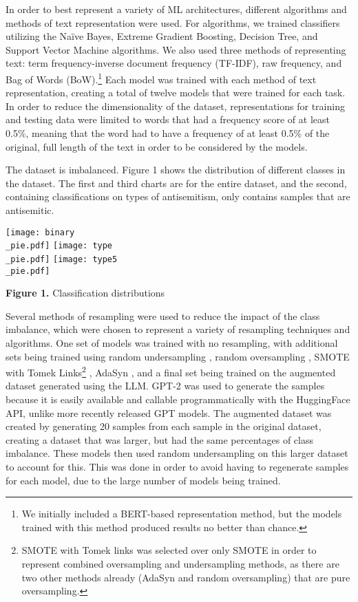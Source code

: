 \documentclass[runningheads]{llncs}
\newenvironment{nscenter}
 {\parskip=0pt\par\nopagebreak\centering}
 {\par\noindent\ignorespacesafterend}
\begin{document}
In order to best represent a variety of ML architectures, different algorithms and methods of text representation were used. For algorithms, we trained classifiers utilizing the Naïve Bayes, Extreme Gradient Boosting, Decision Tree, and Support Vector Machine algorithms. We also used three methods of representing text: term frequency-inverse document frequency (TF-IDF), raw frequency, and Bag of Words (BoW).\footnote{We initially included a BERT-based representation method, but the models trained with this method produced results no better than chance.} Each model was trained with each method of text representation, creating a total of twelve models that were trained for each task. In order to reduce the dimensionality of the dataset, representations for training and testing data were limited to words that had a frequency score of at least 0.5\%, meaning that the word had to have a frequency of at least 0.5\% of the original, full length of the text in order to be considered by the models.

The dataset is imbalanced. Figure 1 shows the distribution of different classes in the dataset. The first and third charts are for the entire dataset, and the second, containing classifications on types of antisemitism, only contains samples that are antisemitic.\\

\begin{nscenter}
\texttt{[image: binary\\\_pie.pdf]}
\texttt{[image: type\\\_pie.pdf]}
\texttt{[image: type5\\\_pie.pdf]}

{\bf Figure 1.} Classification distributions
\end{nscenter}

Several methods of resampling were used to reduce the impact of the class imbalance, which were chosen to represent a variety of resampling techniques and algorithms. One set of models was trained with no resampling, with additional sets being trained using random undersampling \cite{shelke}, random oversampling \cite{shelke}, SMOTE with Tomek Links\footnote{SMOTE with Tomek links was selected over only SMOTE in order to represent combined oversampling and undersampling methods, as there are two other methods already (AdaSyn and random oversampling) that are pure oversampling.} \cite{fernandez}, AdaSyn \cite{he}, and a final set being trained on the augmented dataset generated using the LLM. GPT-2 was used to generate the samples because it is easily available and callable programmatically with the HuggingFace API, unlike more recently released GPT models. The augmented dataset was created by generating 20 samples from each sample in the original dataset, creating a dataset that was larger, but had the same percentages of class imbalance. These models then used random undersampling on this larger dataset to account for this. This was done in order to avoid having to regenerate samples for each model, due to the large number of models being trained.
\end{document}

